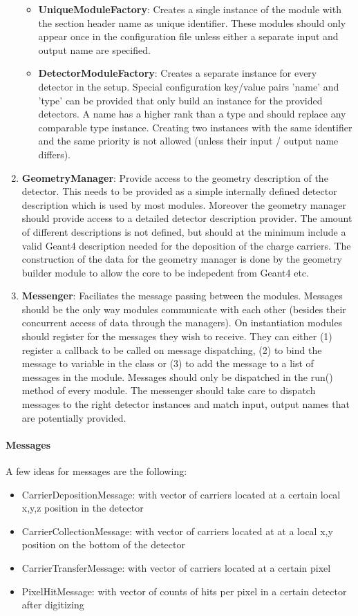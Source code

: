 \begin{enumerate}
\begin{itemize}
\item \textbf{UniqueModuleFactory}: Creates a single instance of the module with the section header name as unique identifier. These modules should only appear once in the configuration file unless either a separate input and output name are specified.
\item \textbf{DetectorModuleFactory}: Creates a separate instance for every detector in the setup. Special configuration key/value pairs 'name' and 'type' can be provided that only build an instance for the provided detectors. A name has a higher rank than a type and should replace any comparable type instance. Creating two instances with the same identifier and the same priority is not allowed (unless their input / output name differs).
\end{itemize}
\item \textbf{GeometryManager}: Provide access to the geometry description of the detector. This needs to be provided as a simple internally defined detector description which is used by most modules. Moreover the geometry manager should provide access to a detailed detector description provider. The amount of different descriptions is not defined, but should at the minimum include a valid Geant4 description needed for the deposition of the charge carriers. The construction of the data for the geometry manager is done by the geometry builder module to allow the core to be indepedent from Geant4 etc.
\item \textbf{Messenger}: Faciliates the message passing between the modules. Messages should be the only way modules communicate with each other (besides their concurrent access of data through the managers). On instantiation modules should register for the messages they wish to receive. They can either (1) register a callback to be called on message dispatching, (2) to bind the message to variable in the class or (3) to add the message to a list of messages in the module. Messages should only be dispatched in the run() method of every module. The messenger should take care to dispatch messages to the right detector instances and match input, output names that are potentially provided.
\end{enumerate}

\paragraph{Messages}
A few ideas for messages are the following:
\begin{itemize}
\item CarrierDepositionMessage: with vector of carriers located at a certain local x,y,z position in the detector
\item CarrierCollectionMessage: with vector of carriers located at at a local x,y position on the bottom of the detector
\item CarrierTransferMessage: with vector of carriers located at a certain pixel
\item PixelHitMessage: with vector of counts of hits per pixel in a certain detector after digitizing
\end{itemize}
